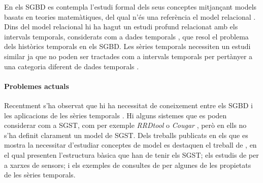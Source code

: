 



En els SGBD es contempla l'estudi formal dels seus conceptes
mitjançant models basats en teories matemàtiques, del qual n'és una
referència el model relacional \parencite{date:introduction}.  Dins
del model relacional hi ha hagut un estudi profund relacionat amb els
intervals temporals, considerats com a dades
temporals \parencite{date02:_tempor_data_relat_model}, que resol el
problema dels històrics temporals en els SGBD. Les sèries temporals
necessiten un estudi similar ja que no poden ser tractades com a
intervals temporals per pertànyer a una categoria diferent de dades
temporals \parencite{assfalg08:thesis,schmidt95}.



\paragraph{Problemes actuals}

Recentment s'ha observat que hi ha necessitat de coneixement entre els
SGBD i les aplicacions de les sèries
temporals \parencite{stonebraker09:scidb,zhang11}.  Hi alguns sistemes
que es poden considerar com a SGST, com per exemple
\emph{RRDtool} \parencite{rrdtool} o \emph{Cougar} \parencite{cougar},
però en ells no s'ha definit clarament un model de SGST.  Dels
treballs publicats en els que es mostra la necessitar d'estudiar
conceptes de model es destaquen el treball de \textcite{dreyer94}, en
el qual presenten l'estructura bàsica que han de tenir els SGST; els
estudis de \textcite{bonnet01} per a xarxes de sensors; i els exemples
de consultes de \textcite{zhang11} per algunes de les propietats de
les sèries temporals.



